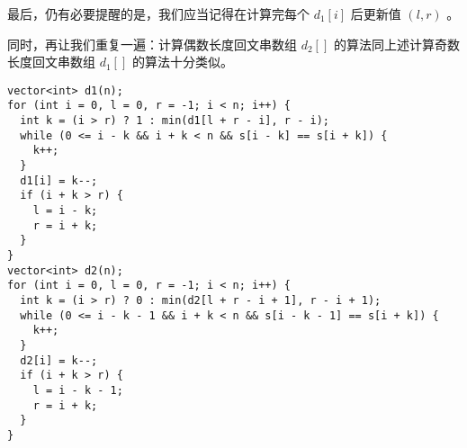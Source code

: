 最后，仍有必要提醒的是，我们应当记得在计算完每个 $d_1[i]$ 后更新值 $(l, r)$ 。

同时，再让我们重复一遍：计算偶数长度回文串数组 $d_2[]$ 的算法同上述计算奇数长度回文串数组 $d_1[]$ 的算法十分类似。
\begin{lstlisting}
vector<int> d1(n);
for (int i = 0, l = 0, r = -1; i < n; i++) {
  int k = (i > r) ? 1 : min(d1[l + r - i], r - i);
  while (0 <= i - k && i + k < n && s[i - k] == s[i + k]) {
    k++;
  }
  d1[i] = k--;
  if (i + k > r) {
    l = i - k;
    r = i + k;
  }
}
vector<int> d2(n);
for (int i = 0, l = 0, r = -1; i < n; i++) {
  int k = (i > r) ? 0 : min(d2[l + r - i + 1], r - i + 1);
  while (0 <= i - k - 1 && i + k < n && s[i - k - 1] == s[i + k]) {
    k++;
  }
  d2[i] = k--;
  if (i + k > r) {
    l = i - k - 1;
    r = i + k;
  }
}
\end{lstlisting}
